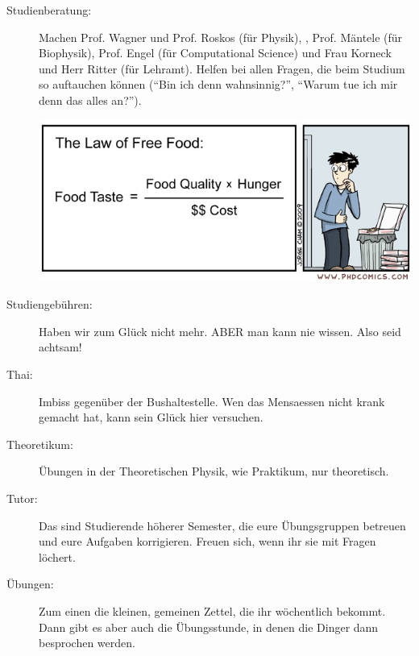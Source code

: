 \begin{description}
    \item[Studienberatung:]Machen Prof. Wagner und Prof. Roskos (für Physik),
, Prof. Mäntele (für Biophysik),
    Prof. Engel (für Computational Science) und Frau Korneck und Herr Ritter
    (für Lehramt).
Helfen bei allen Fragen, die beim
Studium so auftauchen können ("`Bin ich denn wahnsinnig?"',
"`Warum tue ich mir denn das alles an?"').

\begin{center}
    \includegraphics[width=.9\textwidth]{bilder/food.jpg}
\end{center}

\item[Studiengebühren:] Haben wir zum Gl\"uck nicht mehr.
ABER man kann nie wissen.
Also seid achtsam!

\item[Thai:] Imbiss gegen\"uber der Bushaltestelle.
Wen das Mensaessen nicht krank gemacht hat, kann sein Gl\"uck hier versuchen.

 \item[Theoretikum:]Übungen in der Theoretischen Physik, wie Praktikum, nur
theoretisch.

    \item[Tutor:] Das sind Studierende höherer Semester, die eure
Übungsgruppen betreuen und eure Aufgaben korrigieren.
Freuen sich, wenn ihr sie mit Fragen löchert.

    \item[Übungen:]
Zum einen die kleinen, gemeinen Zettel, die ihr wöchentlich bekommt.
Dann gibt es aber auch die Übungsstunde, in denen die Dinger dann besprochen werden.



\end{description}

